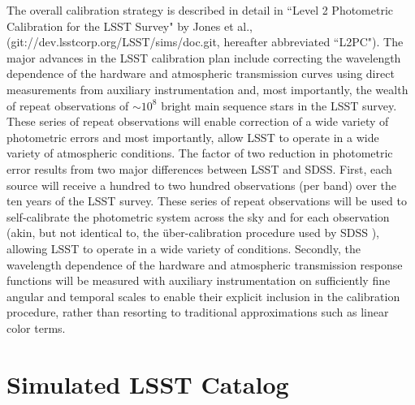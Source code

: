\documentclass[12pt,preprint]{aastex}
\begin{document}
The overall calibration strategy is described in detail in ``Level 2
Photometric Calibration for the LSST Survey" by Jones et al.,
(git://dev.lsstcorp.org/LSST/sims/doc.git, hereafter abbreviated
``L2PC"). The major advances in the LSST calibration plan include
correcting the wavelength dependence of the hardware and atmospheric
transmission curves using direct measurements from auxiliary
instrumentation and, most importantly, the wealth of repeat
observations of $\sim10^8$ bright main sequence stars in the LSST
survey. These series of repeat observations will enable correction of
a wide variety of photometric errors and most importantly, allow LSST
to operate in a wide variety of atmospheric conditions.  The factor of
two reduction in photometric error results from two major differences
between LSST and SDSS. First, each source will receive a hundred to
two hundred observations (per band) over the ten years of the LSST
survey. These series of repeat observations will be used to
self-calibrate the photometric system across the sky and for each
observation (akin, but not identical to, the \"{u}ber-calibration
procedure used by SDSS \citep{pad08}), allowing LSST to operate in a
wide variety of conditions. Secondly, the wavelength dependence of the
hardware and atmospheric transmission response functions will be
measured with auxiliary instrumentation on sufficiently fine angular
and temporal scales to enable their explicit inclusion in the
calibration procedure, rather than resorting to traditional
approximations such as linear color terms.










\section{Simulated LSST Catalog}
\end{document}
